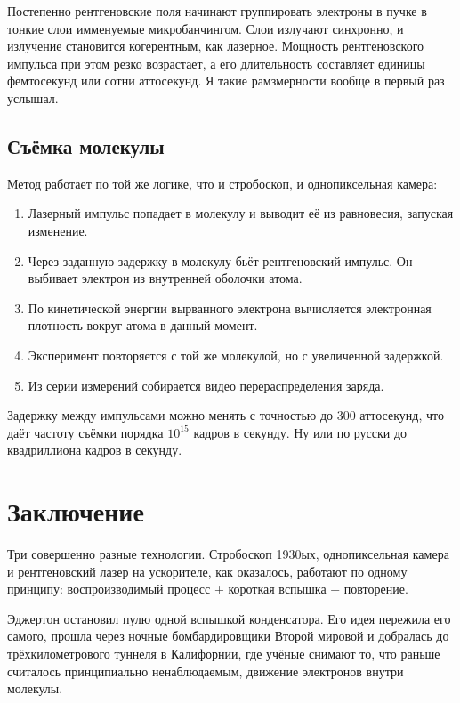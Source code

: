 \documentclass[a4paper, 11pt]{extarticle}
\begin{document}
Постепенно рентгеновские поля начинают группировать электроны в пучке в тонкие слои имменуемые микробанчингом. Слои излучают синхронно, и излучение становится когерентным, как лазерное. Мощность рентгеновского импульса при этом резко возрастает, а его длительность составляет единицы фемтосекунд или сотни аттосекунд. Я такие рамзмерности вообще в первый раз услышал.

\subsection{Съёмка молекулы}

Метод работает по той же логике, что и стробоскоп, и однопиксельная камера:

\begin{enumerate}
    \item Лазерный импульс попадает в молекулу и выводит её из равновесия, запуская изменение.
    \item Через заданную задержку в молекулу бьёт рентгеновский импульс. Он выбивает электрон из внутренней оболочки атома.
    \item По кинетической энергии вырванного электрона вычисляется электронная плотность вокруг атома в данный момент.
    \item Эксперимент повторяется с той же молекулой, но с увеличенной задержкой.
    \item Из серии измерений собирается видео перераспределения заряда.
\end{enumerate}

Задержку между импульсами можно менять с точностью до 300 аттосекунд, что даёт частоту съёмки порядка $10^{15}$ кадров в секунду. Ну или по русски до квадриллиона кадров в секунду. 

\section{Заключение}

Три совершенно разные технологии. Стробоскоп 1930ых, однопиксельная камера и рентгеновский лазер на ускорителе, как оказалось, работают по одному принципу: воспроизводимый процесс + короткая вспышка + повторение.

Эджертон остановил пулю одной вспышкой конденсатора. Его идея пережила его самого, прошла через ночные бомбардировщики Второй мировой и добралась до трёхкилометрового туннеля в Калифорнии, где учёные снимают то, что раньше считалось принципиально ненаблюдаемым, движение электронов внутри молекулы. 
\end{document}
